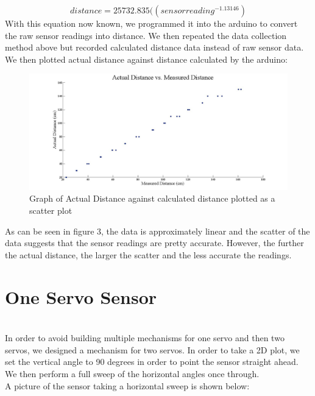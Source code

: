 \documentclass{article}
\begin{document}
\begin{equation}
distance=25732.835((sensor reading^{-1.13146})
\end{equation}
%
With this equation now known, we programmed it into the arduino to convert the raw sensor readings into distance. We then repeated the data collection method above but recorded calculated distance data instead of raw sensor data. We then plotted actual distance against distance calculated by the arduino:
\newpage
%
\begin{figure}[h!]
\begin{center}
\includegraphics[scale=0.2]{MeasuredActual.jpg}
\caption{Graph of Actual Distance against calculated distance plotted as a scatter plot}
\end{center}
\end{figure}
%
As can be seen in figure 3, the data is approximately linear and the scatter of the data suggests that the sensor readings are pretty accurate. However, the further the actual distance, the larger the scatter and the less accurate the readings.

\section{One Servo Sensor} \ \\
%
In order to avoid building multiple mechanisms for one servo and then two servos, we designed a mechanism for two servos. In order to take a 2D plot, we set the vertical angle to 90 degrees in order to point the sensor straight ahead. We then perform a full sweep of the horizontal angles once through. \\

A picture of the sensor taking a horizontal sweep is shown below: \\
\end{document}

